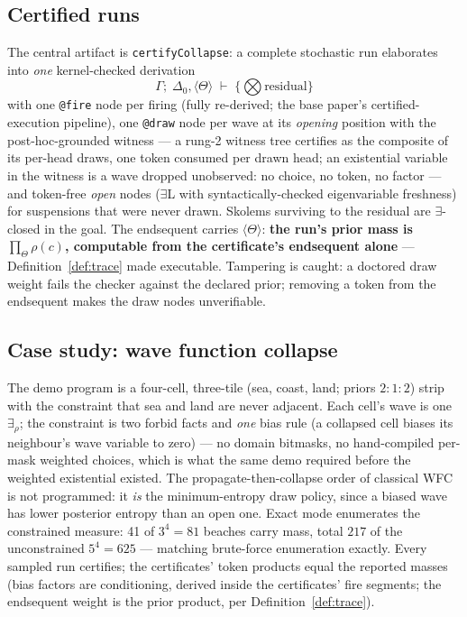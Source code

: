 \documentclass[11pt]{article}
\newcommand{\laxb}[1]{\{#1\}}                   %
\newcommand{\trz}[1]{\langle #1\rangle}            %
\newcommand{\Tr}{\Theta}                           %
\theoremstyle{definition}
\theoremstyle{remark}
\begin{document}
\subsection{Certified runs}

The central artifact is \texttt{certifyCollapse}: a complete
stochastic run elaborates into \emph{one} kernel-checked derivation
\[
  \Gamma;\;\Delta_0, \trz{\Tr} \;\vdash\; \laxb{\textstyle\bigotimes
  \text{residual}}
\]
with one \texttt{@fire} node per firing (fully re-derived; the base
paper's certified-execution pipeline), one \texttt{@draw} node per
wave at its \emph{opening} position with the post-hoc-grounded witness
--- a rung-2 witness tree certifies as the composite of its per-head
draws, one token consumed per drawn head; an existential variable in
the witness is a wave dropped unobserved: no choice, no token, no
factor --- and token-free \emph{open} nodes ($\exists$L with
syntactically-checked eigenvariable freshness) for suspensions that
were never drawn.  Skolems surviving to the residual are
$\exists$-closed in the goal.  The endsequent carries $\trz\Tr$:
\textbf{the run's prior mass is $\prod_{\Tr}\rho(c)$, computable from
the certificate's endsequent alone} --- Definition~\ref{def:trace}
made executable.  Tampering is caught: a doctored draw weight fails
the checker against the declared prior; removing a token from the
endsequent makes the draw nodes unverifiable.

\subsection{Case study: wave function collapse}

The demo program is a four-cell, three-tile (\textsf{sea},
\textsf{coast}, \textsf{land}; priors $2{:}1{:}2$) strip with the
constraint that sea and land are never adjacent.  Each cell's wave is
one $\exists_\rho$; the constraint is two \textsf{forbid} facts and
\emph{one} bias rule (a collapsed cell biases its neighbour's wave
variable to zero) --- no domain bitmasks, no hand-compiled per-mask
weighted choices, which is what the same demo required before the
weighted existential existed.  The propagate-then-collapse order of
classical WFC is not programmed: it \emph{is} the minimum-entropy draw
policy, since a biased wave has lower posterior entropy than an open
one.  Exact mode enumerates the constrained measure: 41 of $3^4=81$
beaches carry mass, total $217$ of the unconstrained $5^4 = 625$ ---
matching brute-force enumeration exactly.  Every sampled run
certifies; the certificates' token products equal the reported masses
(bias factors are conditioning, derived inside the certificates' fire
segments; the endsequent weight is the prior product, per
Definition~\ref{def:trace}).
\end{document}
